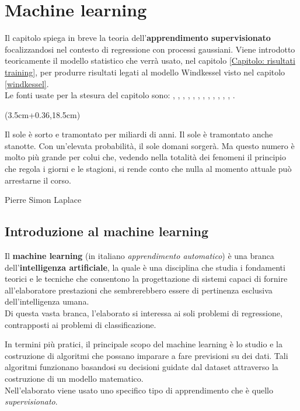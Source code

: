 \chapter{Machine learning}\label{machineLearning}

Il capitolo spiega in breve la teoria dell'\textbf{apprendimento supervisionato} focalizzandosi nel contesto di regressione con processi gaussiani. Viene introdotto teoricamente il modello statistico che verrà usato, nel capitolo \ref{Capitolo: risultati training}, per produrre risultati legati al modello Windkessel visto nel capitolo \ref{windkessel}.\\
Le fonti usate per la stesura del capitolo sono: \cite{murphy_probabilistic_2022}, \cite{wiki:datasets}, \cite{wiki:overfitting}, \cite{pytorch:R2score}, \cite{wang_intuitive_2022}, \cite{noauthor_tutorial_nodate}, \cite{murphy_machine_2012}, \cite{gelman_bayesian_1995}, \cite{wiki:gradientDescend}, \cite{ruder_2022}, \cite{kingma_adam_2017}, \cite{JMLR:v12:duchi11a}, \cite{bottou2012stochastic}.


\begin{textblock*}{0.64\textwidth}(3.5cm+0.36\textwidth,18.5cm)
\epigraph{Il sole è sorto e tramontato per miliardi di anni. Il sole è tramontato anche stanotte. Con un'elevata probabilità, il sole domani sorgerà. Ma questo numero è molto più grande per colui che, vedendo nella totalità dei fenomeni il principio che regola i giorni e le stagioni, si rende conto che nulla al momento attuale può arrestarne il corso.}{Pierre Simon Laplace}
\end{textblock*}

\newpage

\section{Introduzione al machine learning}
Il \textbf{machine learning} (in italiano \textit{apprendimento automatico}) è una branca dell'\textbf{intelligenza artificiale}, la quale è una disciplina che studia i fondamenti teorici e le tecniche che consentono la progettazione di sistemi capaci di fornire all'elaboratore prestazioni che sembrerebbero essere di pertinenza esclusiva dell’intelligenza umana.\\
Di questa vasta branca, l'elaborato si interessa ai soli problemi di regressione, contrapposti ai problemi di classificazione.

In termini più pratici, il principale scopo del machine learning è lo studio e la costruzione di algoritmi che possano imparare a fare previsioni su dei dati. Tali algoritmi funzionano basandosi su decisioni guidate dal dataset  attraverso la costruzione di un modello matematico.\\
Nell'elaborato viene usato uno specifico tipo di apprendimento che è quello \textit{supervisionato}.

